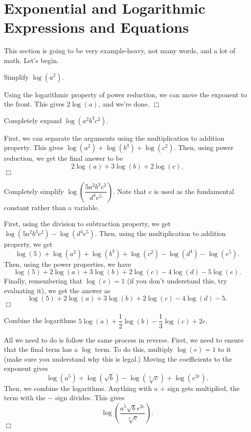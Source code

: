 \documentclass[../book.tex]{subfiles}
\begin{document}
\section{Exponential and Logarithmic Expressions and Equations}
\noindent This section is going to be very example-heavy, not many words, and a lot of math.  Let's begin.
\begin{example}
Simplify $\log(a^2)$.
\end{example}
\begin{solution}
Using the logarithmic property of power reduction, we can move the exponent to the front.  This gives $2\log(a)$, and we're done. $\Box$
\end{solution}
\begin{example}
Completely expand $\log(a^2b^3c^2)$.
\end{example}
\begin{solution}
First, we can separate the arguments using the multiplication to addition property.  This gives $\log(a^2)+\log(b^3)+\log(c^2)$.  Then, using power reduction, we get the final answer to be $$2\log(a)+3\log(b)+2\log(c).$$ $\Box$
\end{solution}
\begin{example}
Completely simplify $\log\left(\dfrac{5a^2b^3c^2}{d^4e^5}\right)$.  Note that $e$ is used as the fundamental constant rather than a variable.
\end{example}
\begin{solution}
First, using the division to subtraction property, we get $\log(5a^2b^3c^2)-\log(d^4e^5)$.  Then, using the multiplication to addition property, we get $$\log(5)+\log(a^2)+\log(b^3)+\log(c^2)-\log(d^4)-\log(e^5).$$  Then, using the power properties, we have $$\log(5)+2\log(a)+3\log(b)+2\log(c)-4\log(d)-5\log(e).$$  Finally, remembering that $\log(e)=1$ (if you don't understand this, try evaluating it), we get the answer as $$\log(5)+2\log(a)+3\log(b)+2\log(c)-4\log(d)-5.$$ $\Box$
\end{solution}
\begin{example}
Combine the logarithms $5\log(a)+\dfrac{1}{2}\log(b)-\dfrac{1}{3}\log(c)+2e.$
\end{example}
\begin{solution}
All we need to do is follow the same process in reverse.  First, we need to ensure that the final term has a $\log$ term.  To do this, multiply $\log(e)=1$ to it (make sure you understand why this is legal.) Moving the coefficients to the exponent gives $$\log(a^5)+\log(\sqrt{b})-\log(\sqrt[3]{c})+\log(e^{2e}).$$ Then, we combine the logarithms.  Anything with a $+$ sign gets multiplied, the term with the $-$ sign divides.  This gives $$\log\left(\dfrac{a^5\sqrt{b}e^{2e}}{\sqrt[3]{c}}\right).$$ $\Box$
\end{solution}
\end{document}
